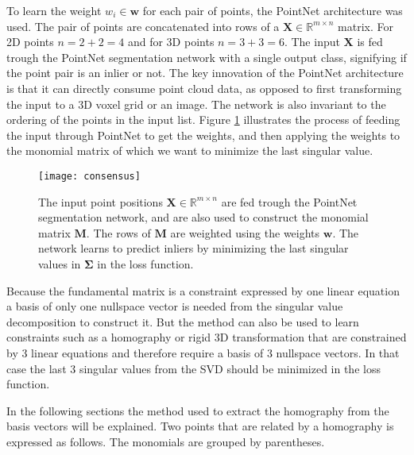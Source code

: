 To learn the weight $w_i \in \textbf{w}$ for each pair of points, the PointNet\cite{pointnet} architecture was used. The pair of points are concatenated into rows of a $\mathbf{X}\in \mathbb{R}^{m\times n} $ matrix. For 2D points $n = 2+2=4$ and for 3D points $n=3+3=6$. The input $\mathbf{X}$ is fed trough the PointNet segmentation network with a single output class, signifying if the point pair is an inlier or not. The key innovation of the PointNet architecture is that it can directly consume point cloud data, as opposed to first transforming the input to a 3D voxel grid or an image. The network is also invariant to the ordering of the points in the input list. Figure \ref{fig:consensus} illustrates the process of feeding the input through PointNet to get the weights, and then applying the weights to the monomial matrix of which we want to minimize the last singular value.

\begin{figure}[H]
	\centering
	\texttt{[image: consensus]}
	\caption{The input point positions $\mathbf{X}\in \mathbb{R}^{m\times n}$ are fed trough the PointNet segmentation network, and are also used to construct the monomial matrix $\mathbf{M}$. The rows of $\mathbf{M}$ are weighted using the weights $\mathbf{w}$. The network learns to predict inliers by minimizing the last singular values in $\mathbf{\Sigma}$ in the loss function.}
	\label{fig:consensus}
\end{figure}

Because the fundamental matrix is a constraint expressed by one linear equation a basis of only one  nullspace vector is needed from the singular value decomposition to construct it. But the method can also be used to learn constraints such as a homography or rigid 3D transformation that are constrained by 3 linear equations and therefore require a basis of 3 nullspace vectors. In that case the last 3 singular values from the SVD should be minimized in the loss function.

In the following sections the method used to extract the homography from the basis vectors will be explained. Two points that are related by a homography is expressed as follows. The monomials are grouped by parentheses.


